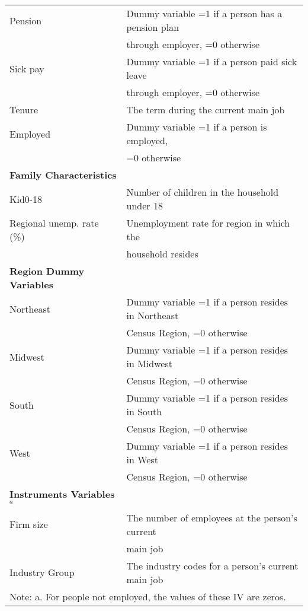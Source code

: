 \documentclass[legno,11pt]{article}
\begin{document}
\begin{longtable}{@{}l@{\hspace{-8pt}}l}
\hspace{0.5cm}Pension&Dummy variable =1 if a person has a pension plan\\[-5pt] &through employer, =0 otherwise  \\[-3pt]
\hspace{0.5cm}Sick pay&Dummy variable =1 if a person paid sick leave\\[-5pt] &through employer, =0 otherwise  \\[-3pt]
\hspace{0.5cm}Tenure&The term during the current main job \\[-3pt]
\hspace{0.5cm}Employed&Dummy variable =1 if a person is employed,\\[-5pt] &=0 otherwise  \\[-1pt]
\textbf{Family Characteristics}\\[-2pt]
\hspace{0.5cm}Kid0-18&Number of children in the household under 18\\[-2pt]
\hspace{0.5cm}Regional unemp. rate (\%)&Unemployment rate for region in which the \\[-3pt]&household resides\\[-1pt]
\textbf{Region Dummy Variables}\\[-2pt]
\hspace{0.5cm}Northeast&Dummy variable =1 if a person resides in Northeast\\[-5pt] & Census Region, =0 otherwise \\[-3pt]
\hspace{0.5cm}Midwest&Dummy variable =1 if a person resides in Midwest\\[-5pt] &Census Region, =0 otherwise \\[-3pt]
\hspace{0.5cm}South&Dummy variable =1 if a person resides in South\\[-5pt] &Census Region, =0 otherwise \\[-3pt]
\hspace{0.5cm}West&Dummy variable =1 if a person resides in West\\[-5pt] &Census Region, =0 otherwise \\[-3pt]
\textbf{Instruments Variables$^{a}$}\\[-2pt]
\hspace{0.5cm}Firm size &The number of employees at the person's
current
\\[-5pt]
& main job\\[-1pt]
\hspace{0.5cm}Industry Group&The industry codes for a person's
current
main job \\[-1pt]
\bottomrule \multicolumn{2}{l}{Note: a. For people not employed, the values of these IV are zeros.}\\[-8pt]
\end{longtable}
\end{document}
